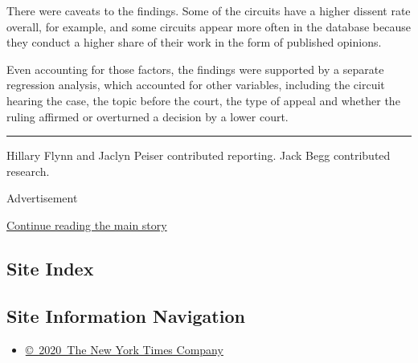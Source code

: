 There were caveats to the findings. Some of the circuits have a higher
dissent rate overall, for example, and some circuits appear more often
in the database because they conduct a higher share of their work in the
form of published opinions.

Even accounting for those factors, the findings were supported by a
separate regression analysis, which accounted for other variables,
including the circuit hearing the case, the topic before the court, the
type of appeal and whether the ruling affirmed or overturned a decision
by a lower court.

\begin{center}\rule{0.5\linewidth}{\linethickness}\end{center}

Hillary Flynn and Jaclyn Peiser contributed reporting. Jack Begg
contributed research.

Advertisement

\protect\hyperlink{after-bottom}{Continue reading the main story}

\hypertarget{site-index}{%
\subsection{Site Index}\label{site-index}}

\hypertarget{site-information-navigation}{%
\subsection{Site Information
Navigation}\label{site-information-navigation}}

\begin{itemize}
\tightlist
\item
  \href{https://help.nytimes3xbfgragh.onion/hc/en-us/articles/115014792127-Copyright-notice}{©~2020~The
  New York Times Company}
\end{itemize}

